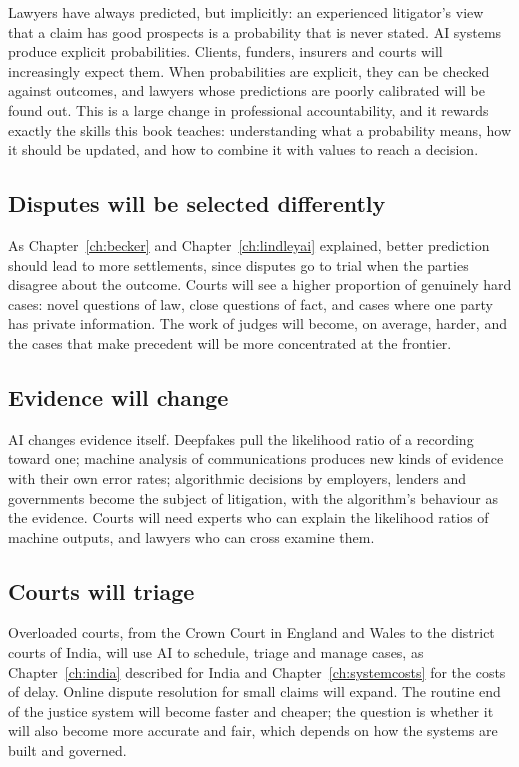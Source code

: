 Lawyers have always predicted, but implicitly: an experienced litigator's view that a claim has good prospects is a probability that is never stated. AI systems produce explicit probabilities. Clients, funders, insurers and courts will increasingly expect them. When probabilities are explicit, they can be checked against outcomes, and lawyers whose predictions are poorly calibrated will be found out. This is a large change in professional accountability, and it rewards exactly the skills this book teaches: understanding what a probability means, how it should be updated, and how to combine it with values to reach a decision.

\subsection{Disputes will be selected differently}

As Chapter~\ref{ch:becker} and Chapter~\ref{ch:lindleyai} explained, better prediction should lead to more settlements, since disputes go to trial when the parties disagree about the outcome. Courts will see a higher proportion of genuinely hard cases: novel questions of law, close questions of fact, and cases where one party has private information. The work of judges will become, on average, harder, and the cases that make precedent will be more concentrated at the frontier.

\subsection{Evidence will change}

AI changes evidence itself. Deepfakes pull the likelihood ratio of a recording toward one; machine analysis of communications produces new kinds of evidence with their own error rates; algorithmic decisions by employers, lenders and governments become the subject of litigation, with the algorithm's behaviour as the evidence. Courts will need experts who can explain the likelihood ratios of machine outputs, and lawyers who can cross examine them.

\subsection{Courts will triage}

Overloaded courts, from the Crown Court in England and Wales to the district courts of India, will use AI to schedule, triage and manage cases, as Chapter~\ref{ch:india} described for India and Chapter~\ref{ch:systemcosts} for the costs of delay. Online dispute resolution for small claims will expand. The routine end of the justice system will become faster and cheaper; the question is whether it will also become more accurate and fair, which depends on how the systems are built and governed.

